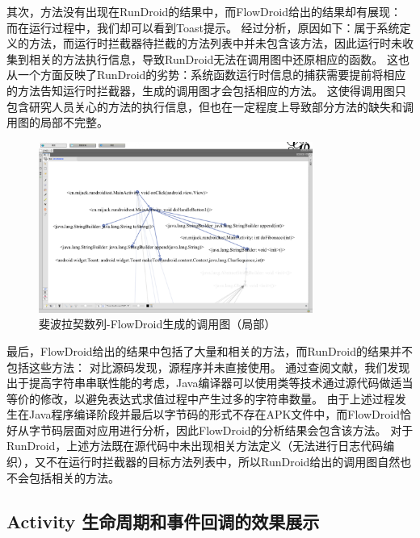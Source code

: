 其次，方法没有出现在RunDroid的结果中，而FlowDroid给出的结果却有展现：
而在运行过程中，我们却可以看到Toast提示。
经过分析，原因如下：属于系统定义的方法，而运行时拦截器待拦截的方法列表中并未包含该方法，因此运行时未收集到相关的方法执行信息，导致RunDroid无法在调用图中还原相应的函数。
这也从一个方面反映了RunDroid的劣势：系统函数运行时信息的捕获需要提前将相应的方法告知运行时拦截器，生成的调用图才会包括相应的方法。
这使得调用图只包含研究人员关心的方法的执行信息，但也在一定程度上导致部分方法的缺失和调用图的局部不完整。


\begin{figure}[!ht]
	\centering
	\includegraphics[width=0.8\textwidth]{./Figures/FlowDroid-Fibonacci.png}
	\caption{斐波拉契数列-FlowDroid生成的调用图（局部）}
	\label{fig:flowdroid-result-Fibonacci}
\end{figure}


最后，FlowDroid给出的结果中包括了大量和相关的方法，而RunDroid的结果并不包括这些方法：
对比源码发现，源程序并未直接使用。
通过查阅文献\cite{gosling2000java}，我们发现出于提高字符串串联性能的考虑，Java编译器可以使用类等技术通过源代码做适当等价的修改，以避免表达式求值过程中产生过多的字符串数量。
由于上述过程发生在Java程序编译阶段并最后以字节码的形式不存在APK文件中，而FlowDroid恰好从字节码层面对应用进行分析，因此FlowDroid的分析结果会包含该方法。
对于RunDroid，上述方法既在源代码中未出现相关方法定义（无法进行日志代码编织），又不在运行时拦截器的目标方法列表中，所以RunDroid给出的调用图自然也不会包括相关的方法。



\subsection{Activity 生命周期和事件回调的效果展示}

